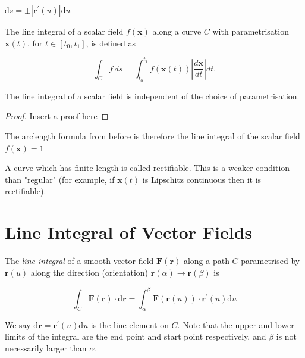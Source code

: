 \begin{nprop}
	$\mathrm{d} s= \pm\left|\mathbf{r}^{\prime}(u)\right| \mathrm{d} u$
\end{nprop}

\begin{ndefi}
	The line integral of a scalar field $f(\boldsymbol{x})$ along a curve $C$ with parametrisation $\boldsymbol{x}(t)$, for $t \in\left[t_0, t_1\right]$, is defined as
	
	$$
	\int_C f \, ds=\int_{t_0}^{t_1} f(\boldsymbol{x}(t))\left|\frac{d \boldsymbol{x}}{d t}\right| d t .
	$$
\end{ndefi}

\begin{nprop}
	The line integral of a scalar field is independent of the choice of parametrisation.
\end{nprop}

\begin{proof}
  Insert a proof here
\end{proof}

\begin{nrem}
	The arclength formula from before is therefore the line integral of the scalar field $f(\mathbf{x}) = 1$
\end{nrem}

\begin{ndefi}[Rectifiable]
	
	A curve which has finite length is called rectifiable. This is a weaker condition than "regular" (for example, if $\boldsymbol{x}(t)$ is Lipschitz continuous then it is rectifiable).
	
\end{ndefi}


\section{Line Integral of Vector Fields}

\begin{ndefi}
	The \emph{line integral} of a smooth vector field $\mathbf{F}(\mathbf{r})$ along a path $C$ parametrised by $\mathbf{r}(u)$ along the direction (orientation) $\mathbf{r}(\alpha) \rightarrow \mathbf{r}(\beta)$ is
	
	$$
	\int_C \mathbf{F}(\mathbf{r}) \cdot \mathrm{d} \mathbf{r}=\int_\alpha^\beta \mathbf{F}(\mathbf{r}(u)) \cdot \mathbf{r}^{\prime}(u) \mathrm{d} u
	$$
	
	
	We say $\mathrm{d} \mathbf{r}=\mathbf{r}^{\prime}(u) \mathrm{d} u$ is the line element on $C$. Note that the upper and lower limits of the integral are the end point and start point respectively, and $\beta$ is not necessarily larger than $\alpha$.
\end{ndefi}

